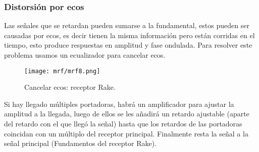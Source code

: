\documentclass[
	12pt, %
	fleqn, %
	a4paper, %
	oneside, %
]{LegrandOrangeBook}
\begin{document}
\subsubsection*{Distorsión por ecos}
Las señales que se retardan pueden sumarse a la fundamental, estos pueden ser causadas por ecos, es decir tienen la misma información pero están corridas en el tiempo, esto produce respuestas en amplitud y fase ondulada. Para resolver este problema usamos un ecualizador para cancelar ecos.
\begin{figure}[H]
\centering
\texttt{[image: mrf/mrf8.png]}
\caption{Cancelar ecos: receptor Rake.}
\end{figure}
Si hay llegado múltiples portadoras, habrá un amplificador para ajustar la amplitud a la llegada, luego de ellos se les añadirá un retardo ajustable (aparte del retardo con el que llegó la señal) hasta que los retardos de las portadoras coincidan con un múltiplo del receptor principal. Finalmente resta la señal a la señal principal (Fundamentos del receptor Rake).
\end{document}
